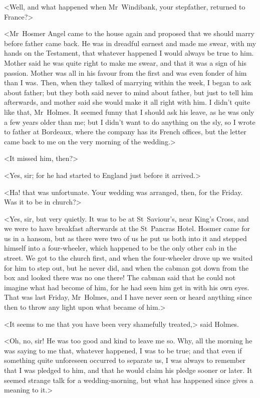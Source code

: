 <Well, and what happened when Mr~Windibank, your stepfather, returned to France?>

<Mr~Hosmer Angel came to the house again and proposed that we should marry before father came back. He was in dreadful earnest and made me swear, with my hands on the Testament, that whatever happened I would always be true to him. Mother said he was quite right to make me swear, and that it was a sign of his passion. Mother was all in his favour from the first and was even fonder of him than I was. Then, when they talked of marrying within the week, I began to ask about father; but they both said never to mind about father, but just to tell him afterwards, and mother said she would make it all right with him. I didn't quite like that, Mr~Holmes. It seemed funny that I should ask his leave, as he was only a few years older than me; but I didn't want to do anything on the sly, so I wrote to father at Bordeaux, where the company has its French offices, but the letter came back to me on the very morning of the wedding.>

<It missed him, then?>

<Yes, sir; for he had started to England just before it arrived.>

<Ha! that was unfortunate. Your wedding was arranged, then, for the Friday. Was it to be in church?>

<Yes, sir, but very quietly. It was to be at St~Saviour's, near King's Cross, and we were to have breakfast afterwards at the St~Pancras Hotel. Hosmer came for us in a hansom, but as there were two of us he put us both into it and stepped himself into a four-wheeler, which happened to be the only other cab in the street. We got to the church first, and when the four-wheeler drove up we waited for him to step out, but he never did, and when the cabman got down from the box and looked there was no one there! The cabman said that he could not imagine what had become of him, for he had seen him get in with his own eyes. That was last Friday, Mr~Holmes, and I have never seen or heard anything since then to throw any light upon what became of him.>

<It seems to me that you have been very shamefully treated,> said Holmes.

<Oh, no, sir! He was too good and kind to leave me so. Why, all the morning he was saying to me that, whatever happened, I was to be true; and that even if something quite unforeseen occurred to separate us, I was always to remember that I was pledged to him, and that he would claim his pledge sooner or later. It seemed strange talk for a wedding-morning, but what has happened since gives a meaning to it.>

